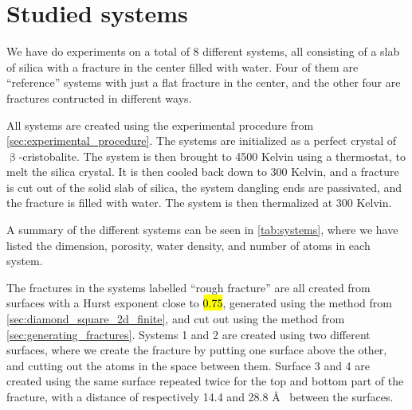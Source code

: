 \chapter{Studied systems}

We have do experiments on a total of 8 different systems, all consisting of a slab of silica with a fracture in the center filled with water. Four of them are ``reference'' systems with just a flat fracture in the center, and the other four are fractures contructed in different ways.

All systems are created using the experimental procedure from \cref{sec:experimental_procedure}. The systems are initialized as a perfect crystal of $\upbeta$-cristobalite. The system is then brought to 4500 Kelvin using a thermostat, to melt the silica crystal. It is then cooled back down to 300 Kelvin, and a fracture is cut out of the solid slab of silica, the system dangling ends are passivated, and the fracture is filled with water. The system is then thermalized at 300 Kelvin.

A summary of the different systems can be seen in \cref{tab:systems}, where we have listed the dimension, porosity, water density, and number of atoms in each system.

The fractures in the systems labelled ``rough fracture'' are all created from surfaces with a Hurst exponent close to \hl{0.75}, generated using the method from \cref{sec:diamond_square_2d_finite}, and cut out using the method from \cref{sec:generating_fractures}. Systems 1 and 2 are created using two different surfaces, where we create the fracture by putting one surface above the other, and cutting out the atoms in the space between them. Surface 3 and 4 are created using the same surface repeated twice for the top and bottom part of the fracture, with a distance of respectively 14.4 and 28.8 \AA~ between the surfaces.

